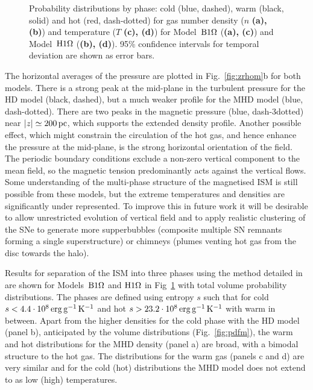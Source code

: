 \begin{figure}
    \caption[Probability distributions by phase for $n$ and $T$]{
  Probability distributions by phase: cold (blue, dashed), warm (black, solid)
  and hot (red, dash-dotted) for gas number density ($n$ {\textbf{(a), (b)}})
  and temperature ($T$ {\textbf{(c), (d)}}) 
  for Model~${\mathrm{B}1\rm{\Omega} }$ ({\textbf{(a), (c)}}) and Model~${\mathrm{H}1\rm{\Omega}}$
  ({\textbf{(b), (d)}}).
  95\% confidence intervals for temporal deviation are shown as error bars.   
  \label{fig:npdf3s}
    }
  \end{figure}

  The horizontal averages of the pressure are plotted in Fig.~\ref{fig:zrhom}b
  for both models. 
  There is a strong peak at the mid-plane in the turbulent pressure for the HD
  model (black, dashed), but a much weaker profile for the MHD model (blue,
  dash-dotted). 
  There are two peaks in the magnetic pressure (blue, dash-3dotted) near 
  $|z|\simeq200\,{\rm pc}$, which supports the extended density profile.
  Another possible effect, which might constrain the circulation of the hot
  gas, and hence enhance the pressure at the mid-plane, is the strong 
  horizontal orientation of the field.
  The periodic boundary conditions
  exclude a non-zero vertical component to the mean field, so the magnetic
  tension predominantly acts against the vertical flows.
  Some understanding of the multi-phase structure of the magnetised ISM is
  still possible from these models, but the extreme temperatures and densities
  are significantly under represented.
  To improve this in future work it will be desirable to allow unrestricted 
  evolution of vertical field and to apply realistic clustering of the 
  SNe to generate more supperbubbles (composite multiple SN remnants forming a
  single superstructure) or chimneys (plumes venting hot gas from the disc 
  towards the halo).

  Results for separation of the ISM into three phases using the method 
  detailed in \cite[][Ch. 5.3]{Gent12} are shown for Models~${\mathrm{B}1\rm{\Omega} }$ and
  ${\mathrm{H}1\rm{\Omega}}$ in Fig~\ref{fig:npdf3s} with total volume probability distributions.
  The phases are defined using entropy $s$ such that for cold 
  $s<4.4\cdot10^{8}\,{\rm erg} \,{\rm g}^{-1}\,{\rm K}^{-1}$ and hot 
  $s>23.2\cdot10^{8}\,{\rm erg} \,{\rm g}^{-1}\,{\rm K}^{-1}$ with warm in between.
  Apart from the higher densities for the cold phase with the HD model (panel 
  b), 
  anticipated by the volume distributions (Fig.~\ref{fig:pdfm}), the warm and
  hot distributions for the MHD density (panel a) are broad, with a bimodal 
  structure to the hot gas. 
  The distributions for the warm gas (panels c and d) are very similar and for
  the cold (hot) distributions the MHD model does not extend to as low (high)
  temperatures. 
  
